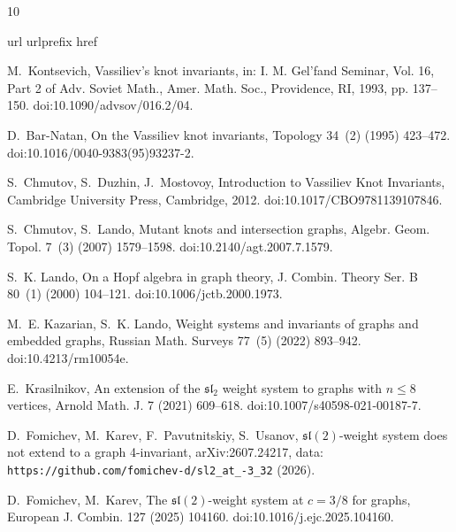 \documentclass[preprint,12pt]{elsarticle}
\theoremstyle{definition}
\begin{document}
\begin{thebibliography}{10}
\raggedright
\expandafter\ifx\csname url\endcsname\relax
  \def\url#1{\texttt{#1}}\fi
\expandafter\ifx\csname urlprefix\endcsname\relax\def\urlprefix{URL }\fi
\expandafter\ifx\csname href\endcsname\relax
  \def\href#1#2{#2} \def\path#1{#1}\fi

M.~Kontsevich, Vassiliev's knot invariants, in: I. M. Gel'fand Seminar, Vol.
  16, Part 2 of Adv. Soviet Math., Amer. Math. Soc., Providence, RI, 1993, pp.
  137--150.
\newblock \href {https://doi.org/10.1090/advsov/016.2/04}
  {\path{doi:10.1090/advsov/016.2/04}}.

D.~Bar-Natan, On the {V}assiliev knot invariants, Topology 34~(2) (1995)
  423--472.
\newblock \href {https://doi.org/10.1016/0040-9383(95)93237-2}
  {\path{doi:10.1016/0040-9383(95)93237-2}}.

S.~Chmutov, S.~Duzhin, J.~Mostovoy, Introduction to {V}assiliev Knot
  Invariants, Cambridge University Press, Cambridge, 2012.
\newblock \href {https://doi.org/10.1017/CBO9781139107846}
  {\path{doi:10.1017/CBO9781139107846}}.

S.~Chmutov, S.~Lando, Mutant knots and intersection graphs, Algebr. Geom.
  Topol. 7~(3) (2007) 1579--1598.
\newblock \href {https://doi.org/10.2140/agt.2007.7.1579}
  {\path{doi:10.2140/agt.2007.7.1579}}.

S.~K. Lando, On a {H}opf algebra in graph theory, J. Combin. Theory Ser. B
  80~(1) (2000) 104--121.
\newblock \href {https://doi.org/10.1006/jctb.2000.1973}
  {\path{doi:10.1006/jctb.2000.1973}}.

M.~E. Kazarian, S.~K. Lando, Weight systems and invariants of graphs and
  embedded graphs, Russian Math. Surveys 77~(5) (2022) 893--942.
\newblock \href {https://doi.org/10.4213/rm10054e}
  {\path{doi:10.4213/rm10054e}}.

E.~Krasilnikov, An extension of the {$\mathfrak{sl}_2$} weight system to graphs
  with $n \le 8$ vertices, Arnold Math. J. 7 (2021) 609--618.
\newblock \href {https://doi.org/10.1007/s40598-021-00187-7}
  {\path{doi:10.1007/s40598-021-00187-7}}.

D.~Fomichev, M.~Karev, F.~Pavutnitskiy, S.~Usanov, {$\mathfrak{sl}(2)$}-weight
  system does not extend to a graph 4-invariant, arXiv:2607.24217, data:
  \url{https://github.com/fomichev-d/sl2_at_-3_32} (2026).

D.~Fomichev, M.~Karev, The {$\mathfrak{sl}(2)$}-weight system at $c = 3/8$ for
  graphs, European J. Combin. 127 (2025) 104160.
\newblock \href {https://doi.org/10.1016/j.ejc.2025.104160}
  {\path{doi:10.1016/j.ejc.2025.104160}}.


\end{thebibliography}
\end{document}
